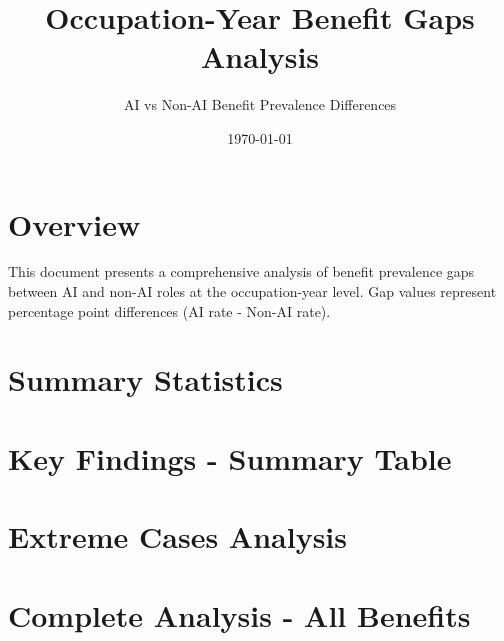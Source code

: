 \documentclass{article}
\title{Occupation-Year Benefit Gaps Analysis}
\author{AI vs Non-AI Benefit Prevalence Differences}
\date{\today}
\begin{document}
\maketitle

\section{Overview}
This document presents a comprehensive analysis of benefit prevalence gaps between AI and non-AI roles at the occupation-year level. Gap values represent percentage point differences (AI rate - Non-AI rate).

\section{Summary Statistics}


\section{Key Findings - Summary Table}


\section{Extreme Cases Analysis}


\section{Complete Analysis - All Benefits}  

\end{document}
